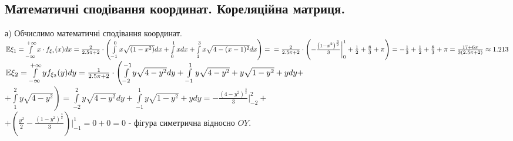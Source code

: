 \documentclass[14pt,a4paper]{scrartcl}
\theoremstyle{definition}
\theoremstyle{remark}
\theoremstyle{definition}
\theoremstyle{definition}
\begin{document}
\subsection{Математичні
сподівання
координат.
Кореляційна матриця.}

а) Обчислимо математичні сподівання координат.\\
$ \mathbb{E}\xi_1 =  \int\limits_{-\infty}^{ +\infty}{ x \cdot f_{\xi_1}(x)dx} = \frac{2}{2.5\pi + 2}\cdot \left( \int\limits_{-1}^{0}{ x\sqrt{(1-x^2)}dx} +  \int\limits_{0}^{ 1}{xdx} +  \int\limits_{1}^{ 3}{x\sqrt{4 - (x-1)^2}dx} \right) =
\\ =
\frac{2}{2.5\pi + 2}\cdot\left( -\frac{\left(1-x^2\right)^\frac{3}{2}}{3} \bigg|_{0}^1  +  \frac{1}{2}  + \frac{8}{3} + \pi  \right) = -\frac{1}{3} +  \frac{1}{2} +  \frac{8}{3} + \pi = \frac{17 + 6 \pi}{3(2.5\pi + 2)} \approx 1.213
$\\
$
\mathbb{E} \xi_2  =  \int\limits_{- \infty}^{ +\infty}{ y f_{\xi_2} (y) dy} =\frac{1}{2.5\pi + 2} \cdot \left(  \int\limits_{-2}^{ -1}{  y\sqrt{4 - y^2}dy}  +  \int\limits_{-1}^{ 1}{ y \sqrt{4 - y^2} + y\sqrt{1-y^2}+ y dy}  +\right. $\\$ \left. +   \int\limits_{1}^{ 2}{y \sqrt{4 - y^2}}\right)  =  \int\limits_{-2}^{ 2}{ y\sqrt{4 - y^2}dy} +  \int\limits_{-1}^{ 1}{y\sqrt{1-y^2}+ y dy} = -\frac{\left(4-y^2\right)^\frac{3}{2}}{3}\bigg |_{-2}^{2}+ $\\$+ \left( 	\frac{y^2}{2}-\frac{\left(1-y^2\right)^\frac{3}{2}}{3} \right) \bigg |_{-1}^{1} = 0 + 0 = 0
$ - фігура симетрична відносно $OY$.\\
\end{document}
